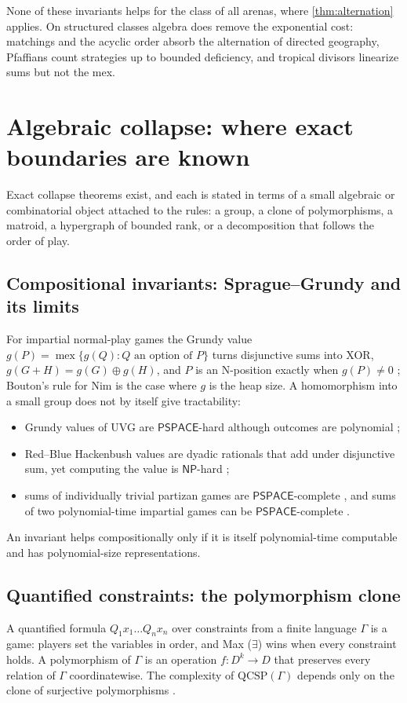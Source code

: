 \documentclass[final]{siamart0516}
\numberwithin{theorem}{section}
\numberwithin{equation}{section}
\theoremstyle{siamnonum}
\theoremstyle{plain}
\newcommand{\cls}[1]{\mathsf{#1}}
\newcommand{\PSPACE}{\cls{PSPACE}}
\newcommand{\NP}{\cls{NP}}
\begin{document}
None of these invariants helps for the class of all arenas, where \cref{thm:alternation} applies. On structured classes algebra does remove the exponential cost: matchings and the acyclic order absorb the alternation of directed geography, Pfaffians count strategies up to bounded deficiency, and tropical divisors linearize sums but not the mex.

\section{Algebraic collapse: where exact boundaries are known}\label{sec:algebraic}

Exact collapse theorems exist, and each is stated in terms of a small algebraic or combinatorial object attached to the rules: a group, a clone of polymorphisms, a matroid, a hypergraph of bounded rank, or a decomposition that follows the order of play.

\subsection{Compositional invariants: Sprague--Grundy and its limits}
For impartial normal-play games the Grundy value $g(P)=\operatorname{mex}\{g(Q):Q\text{ an option of }P\}$ turns disjunctive sums into XOR, $g(G+H)=g(G)\oplus g(H)$, and $P$ is an N-position exactly when $g(P)\ne0$ \cite{Sprague,Grundy}; Bouton's rule for Nim \cite{Bouton} is the case where $g$ is the heap size. A homomorphism into a small group does not by itself give tractability:
\begin{itemize}
\item Grundy values of UVG are $\PSPACE$-hard although outcomes are polynomial \cite{BFT};
\item Red--Blue Hackenbush values are dyadic rationals that add under disjunctive sum, yet computing the value is $\NP$-hard \cite{WinningWays,DemaineHearn};
\item sums of individually trivial partizan games are $\PSPACE$-complete \cite{Morris}, and sums of two polynomial-time impartial games can be $\PSPACE$-complete \cite{BFT}.
\end{itemize}
An invariant helps compositionally only if it is itself polynomial-time computable and has polynomial-size representations.

\subsection{Quantified constraints: the polymorphism clone}\label{ssec:qcsp}
A quantified formula $Q_1x_1\dots Q_nx_n$ over constraints from a finite language $\Gamma$ is a game: players set the variables in order, and Max ($\exists$) wins when every constraint holds. A polymorphism of $\Gamma$ is an operation $f\colon D^k\to D$ that preserves every relation of $\Gamma$ coordinatewise. The complexity of $\mathrm{QCSP}(\Gamma)$ depends only on the clone of surjective polymorphisms \cite{BBCJK}.
\end{document}
